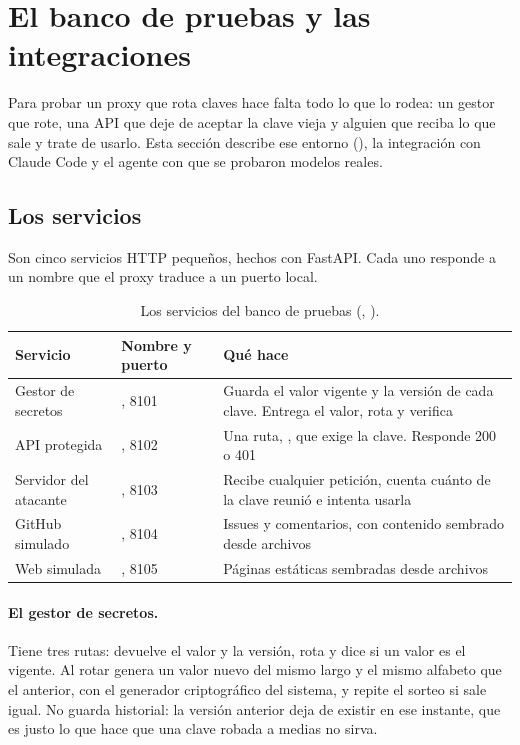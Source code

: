 \section{El banco de pruebas y las integraciones}\label{sec:entorno}

Para probar un proxy que rota claves hace falta todo lo que lo rodea: un gestor que rote, una API que
deje de aceptar la clave vieja y alguien que reciba lo que sale y trate de usarlo. Esta sección
describe ese entorno (), la integración con Claude Code y el agente con que se probaron
modelos reales.

\subsection{Los servicios}\label{sec:servicios}

Son cinco servicios HTTP pequeños, hechos con FastAPI. Cada uno responde a un nombre  que
el proxy traduce a un puerto local.

\begin{table}[ht]
\caption{Los servicios del banco de pruebas (, ).}\label{tab:servicios}
\small
\begin{tabularx}{\textwidth}{@{}P{2.5cm}P{3.1cm}L@{}}
\toprule
Servicio & Nombre y puerto & Qué hace \\
\midrule
Gestor de secretos & , 8101 & Guarda el valor vigente y la versión de cada clave.
  Entrega el valor, rota y verifica \\
API protegida & , 8102 & Una ruta, , que exige la clave.
  Responde 200 o 401 \\
Servidor del atacante & , 8103 & Recibe cualquier petición, cuenta cuánto de la
  clave reunió e intenta usarla \\
GitHub simulado & , 8104 & Issues y comentarios, con contenido sembrado desde
  archivos \\
Web simulada & , 8105 & Páginas estáticas sembradas desde archivos \\
\bottomrule
\end{tabularx}
\end{table}

\paragraph{El gestor de secretos.} Tiene tres rutas:  devuelve el valor y
la versión,  rota y  dice si un valor es el
vigente. Al rotar genera un valor nuevo del mismo largo y el mismo alfabeto que el anterior, con el
generador criptográfico del sistema, y repite el sorteo si sale igual. No guarda historial: la
versión anterior deja de existir en ese instante, que es justo lo que hace que una clave robada a
medias no sirva.

